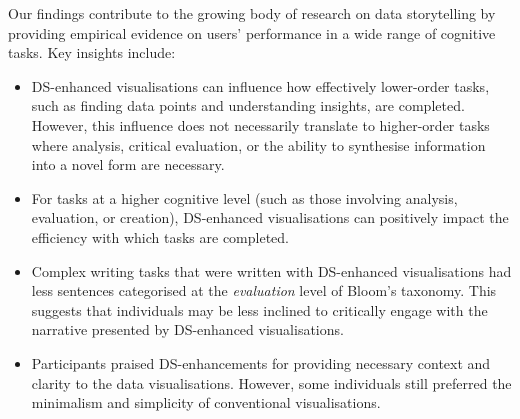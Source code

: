 Our findings contribute to the growing body of research on data storytelling by providing empirical evidence on users' performance in a wide range of cognitive tasks. Key insights include:
\begin{itemize}
    \item DS-enhanced visualisations can influence how effectively lower-order tasks, such as finding data points and understanding insights, are completed. However, this influence does not necessarily translate to higher-order tasks where analysis, critical evaluation, or the ability to synthesise information into a novel form are necessary.
    \item For tasks at a higher cognitive level (such as those involving analysis, evaluation, or creation), DS-enhanced visualisations can positively impact the efficiency with which tasks are completed.
    \item Complex writing tasks that were written with DS-enhanced visualisations had less sentences categorised at the \textit{evaluation} level of Bloom's taxonomy. This suggests that individuals may be less inclined to critically engage with the narrative presented by DS-enhanced visualisations.
    \item Participants praised DS-enhancements for providing necessary context and clarity to the data visualisations. However, some individuals still preferred the minimalism and simplicity of conventional visualisations. 
\end{itemize}

